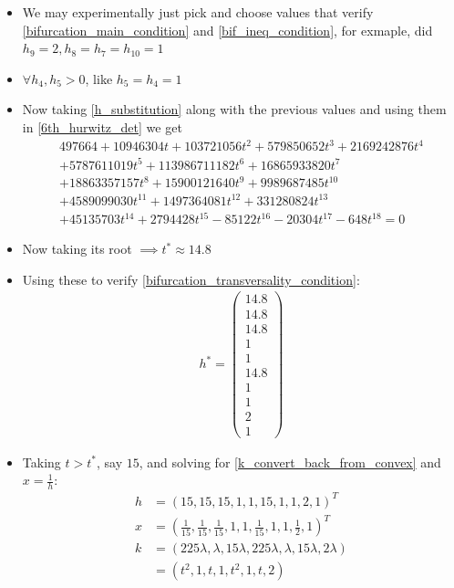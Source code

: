 \begin{itemize}
	\item {} We may experimentally just pick and choose values that verify	\ref{bifurcation_main_condition} and \ref{bif_ineq_condition}, for exmaple, \cite{conradi2024} did $ h_9 = 2, h_8 = h_7 = h_{ 10 } = 1$
	\item {} $\forall h_4, h_5 > 0$, like $h_5 = h_4 = 1$
	\item {} Now taking \ref{h_substitution} along with the previous values and using them in \ref{6th_hurwitz_det} we get
		\begin{gather*}
			497664+10946304t+103721056t^{2}+579850652t^{3}+2169242876t^{4} \\
			+5787611019t^{5}+113986711182t^{6}+16865933820t^{7} \\
			+18863357157t^{8}+15900121640t^{9}+9989687485t^{10} \\
			+4589099030t^{11}+1497364081t^{12}+331280824t^{13} \\
			+45135703t^{14}+2794428t^{15}-85122t^{16}-20304t^{17}-648t^{18}=0	
		\end{gather*}
	\item {} Now taking its root $\implies t^* \approx 14.8$
	\item {} Using these to verify \ref{bifurcation_transversality_condition}:
		\begin{align*}
			h^* =
			\begin{pmatrix}
				14.8 \\
				14.8 \\
				14.8 \\
				1 \\
				1 \\
				14.8 \\
				1 \\
				1 \\
				2 \\
				1
			\end{pmatrix}
		\end{align*}
	\item {} Taking $t > t^*$, say $15$, and solving for \ref{k_convert_back_from_convex} and $x = \frac{1}{h}$:
		\begin{align}
			h &= \left(15,15,15, 1,1,15,1,1,2,1\right)^T \\
			x &= \left( \frac{1}{15},\frac{1}{15},\frac{1}{15},1,1,\frac{1}{15},1,1,\frac{1}{2},1 \right)^T \\
			k &= \left( 225 \lambda, \lambda, 15\lambda, 225\lambda, \lambda, 15\lambda, 2\lambda  \right) \\
			&= (t^{2},1,t,1,t^{2},1,t,2)
		\end{align}
\end{itemize}
